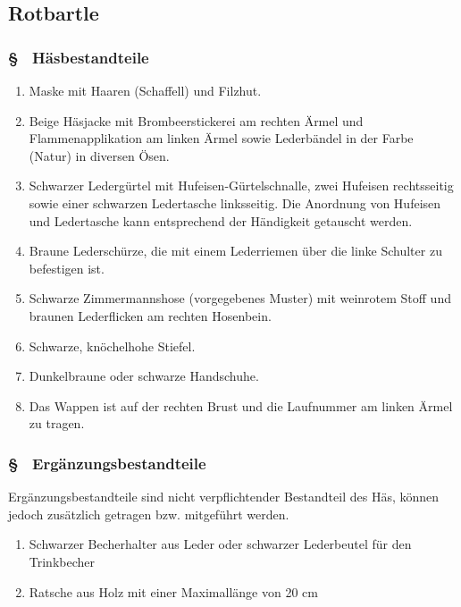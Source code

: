 \subsection{Rotbartle}
\subsubsection{§ \thehoparagraphcounter\ Häsbestandteile} \label{ho:par:haesbestandteile_rotbartle}
\begin{enumerate}
    \item \label{ho:abs:crzc6c} Maske mit Haaren (Schaffell) und Filzhut.
    
    \item \label{ho:abs:ynb53m} Beige Häsjacke mit Brombeerstickerei am rechten Ärmel und Flammenapplikation am linken Ärmel sowie Lederbändel in der Farbe (Natur) in diversen Ösen.

    \item \label{ho:abs:s3kng3} Schwarzer Ledergürtel mit Hufeisen-Gürtelschnalle, zwei Hufeisen rechtsseitig sowie einer schwarzen Ledertasche linksseitig. Die Anordnung von Hufeisen und Ledertasche kann entsprechend der Händigkeit getauscht werden.

    \item \label{ho:abs:nmltup} Braune Lederschürze, die mit einem Lederriemen über die linke Schulter zu befestigen ist.

    \item \label{ho:abs:f352jk} Schwarze Zimmermannshose (vorgegebenes Muster) mit weinrotem Stoff und braunen Lederflicken am rechten Hosenbein.

    \item \label{ho:abs:hs1uye} Schwarze, knöchelhohe Stiefel.

    \item \label{ho:abs:ir4uec} Dunkelbraune oder schwarze Handschuhe.

    \item \label{ho:abs:9jxlqo} Das Wappen ist auf der rechten Brust und die Laufnummer am linken Ärmel zu tragen.
\end{enumerate}

\subsubsection{§ \thehoparagraphcounter\ Ergänzungsbestandteile} \label{ho:par:ergaenzungsbestandteile_rotbartle}
Ergänzungsbestandteile sind nicht verpflichtender Bestandteil des Häs, können jedoch zusätzlich getragen bzw. mitgeführt werden.
\begin{enumerate}
    \item \label{ho:abs:h3l2ox} Schwarzer Becherhalter aus Leder oder schwarzer Lederbeutel für den Trinkbecher
    
    \item \label{ho:abs:mgcd67} Ratsche aus Holz mit einer Maximallänge von 20 cm
\end{enumerate}

